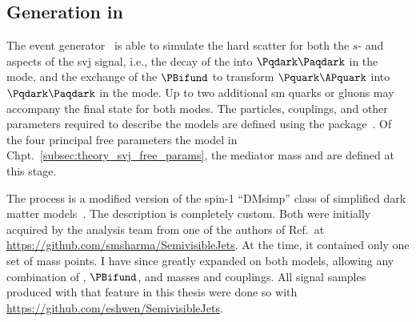 




\subsection{Generation in \texorpdfstring{\MADGRAPH}{MadGraph}}
\label{subsec:svj_signal_madgraph}

The \MADGRAPHFULL event generator~\cite{Alwall:2011madgraph} is able to simulate the hard scatter for both the $s$- and \tchannel aspects of the \gls{svj} signal, i.e., the decay of the \PZprime into $\Pqdark\Paqdark$ in the \schannel mode, and the exchange of the $\PBifund$ to transform $\Pquark\APquark$ into $\Pqdark\Paqdark$ in the \tchannel mode. Up to two additional \acrlong{sm} quarks or gluons may accompany the final state for both modes. The particles, couplings, and other parameters required to describe the models are defined using the \FEYNRULES package~\cite{Alloul:2013bka}. Of the four principal free parameters the model in Chpt.~\ref{subsec:theory_svj_free_params}, the mediator mass and \mqdark are defined at this stage.

The \schannel process is a modified version of the spin-1 ``DMsimp'' class of simplified dark matter models~\cite{Backovic:2015soa}. The \tchannel description is completely custom. Both were initially acquired by the analysis team from one of the authors of Ref.~at \url{https://github.com/smsharma/SemivisibleJets}. At the time, it contained only one set of mass points. I have since greatly expanded on both models, allowing any combination of \PZprime, $\PBifund$, and \Pqdark masses and couplings. All signal samples produced with \MADGRAPH that feature in this thesis were done so with \url{https://github.com/eshwen/SemivisibleJets}. %

